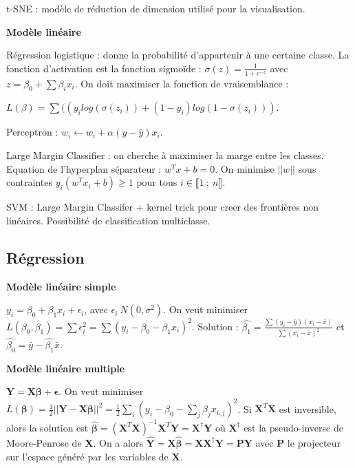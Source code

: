 \documentclass[5pt,a4paper]{article}
\begin{document}
t-SNE : modèle de réduction de dimension utilisé pour la visualisation.

\textbf{Modèle linéaire}

Régression logistique : donne la probabilité d'appartenir à une certaine classe. La fonction d'activation est la fonction sigmoïde : $\sigma (z) = \frac{1}{1+e^{-z}}$ avec $z = \beta _0 + \sum \beta _i x_i$. On doit maximiser la fonction de vraisemblance : 

$L(\beta) = \sum ((y_ilog(\sigma (z_i)) + (1-y_i)log(1-\sigma (z_i)))$.

Perceptron : $w_i \leftarrow w_i + \alpha (y - \hat{y})x_i$.

Large Margin Classifier : on cherche à maximiser la marge entre les classes. Equation de l'hyperplan séparateur : $w^Tx+b=0$. On minimise $||w||$ sous contraintes $y_i(w^Tx_i+b)\ge 1$ pour tous $i \in \llbracket 1 ~;~ n \rrbracket$.

SVM : Large Margin Classifer + kernel trick pour creer des frontières non linéaires. Possibilité de classification multiclasse.

\subsection*{Régression}
\textbf{Modèle linéaire simple}

$y_i = \beta _0 + \beta _1x_i + \epsilon _i$, avec $\epsilon _i ~ N(0,\sigma ^2)$. On veut minimiser $L(\beta _0, \beta _1) = \sum \epsilon _i^2 = \sum (y_i - \beta _0 - \beta _1 x_i)^2$. Solution : $\hat{\beta _1} = \frac{\sum (y_i-\bar{y})(x_i-\bar{x})}{\sum (x_i-\bar{x})^2}$ et $\hat{\beta _0} = \bar{y} - \hat{\beta _1} \bar{x}$.

\textbf{Modèle linéaire multiple}

$\mathbf{Y} = \mathbf{X} \boldsymbol{\beta} + \boldsymbol{\epsilon}$. On veut minimiser $L(\boldsymbol{\beta}) = \frac{1}{2} ||\mathbf{Y} - \mathbf{X} \boldsymbol{\beta} ||^2 = \frac{1}{2} \sum_i (y_i - \beta _0 - \sum _j \beta _j x_{i,j})^2$. Si $\mathbf{X}^T \mathbf{X}$ est inversible, alors la solution est $\hat{\boldsymbol{\beta}} = (\mathbf{X}^T \mathbf{X})^{-1} \mathbf{X}^T \mathbf{Y} = \mathbf{X}^{\dagger} \mathbf{Y}$ où $\mathbf{X}^{\dagger}$ est la pseudo-inverse de Moore-Penrose de $\mathbf{X}$. On a alors $\hat{\mathbf{Y}} = \mathbf{X} \hat{\boldsymbol{\beta}} = \mathbf{X} \mathbf{X}^{\dagger} \mathbf{Y} = \mathbf{P} \mathbf{Y}$ avec $\mathbf{P}$ le projecteur sur l'espace généré par les variables de $\mathbf{X}$.
\end{document}
